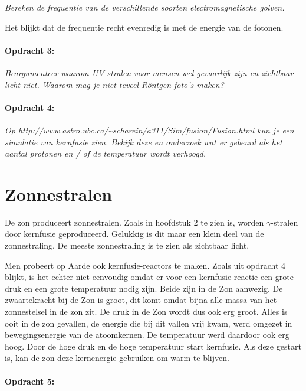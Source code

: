 \emph{Bereken de frequentie van de verschillende soorten electromagnetische
golven.}

Het blijkt dat de frequentie recht evenredig is met de energie van
de fotonen.


\paragraph*{Opdracht 3:}

\emph{Beargumenteer waarom UV-stralen voor mensen wel gevaarlijk zijn
en zichtbaar licht niet. Waarom mag je niet teveel Röntgen foto's
maken?}


\paragraph*{Opdracht 4:}

\emph{Op
http://www.astro.ubc.ca/\textasciitilde{}scharein/a311/Sim/fusion/Fusion.html
kun je een simulatie van kernfusie zien. Bekijk deze en onderzoek
wat er gebeurd als het aantal protonen en / of de temperatuur wordt
verhoogd.}


\section{Zonnestralen}

De zon produceert zonnestralen. Zoals in hoofdstuk 2 te zien is, worden
$\gamma$-stralen door kernfusie geproduceerd. Gelukkig is dit maar
een klein deel van de zonnestraling. De meeste zonnestraling is te
zien als zichtbaar licht.

Men probeert op Aarde ook kernfusie-reactors te maken. Zoals uit opdracht
4 blijkt, is het echter niet eenvoudig omdat er voor een kernfusie
reactie een grote druk en een grote temperatuur nodig zijn. Beide
zijn in de Zon aanwezig. De zwaartekracht bij de Zon is groot, dit
komt omdat bijna alle massa van het zonnestelsel in de zon zit. De
druk in de Zon wordt dus ook erg groot. Alles is ooit in de zon gevallen,
de energie die bij dit vallen vrij kwam, werd omgezet in bewegingsenergie
van de atoomkernen. De temperatuur werd daardoor ook erg hoog. Door
de hoge druk en de hoge temperatuur start kernfusie. Als deze gestart
is, kan de zon deze kernenergie gebruiken om warm te blijven.


\paragraph*{Opdracht 5:}

